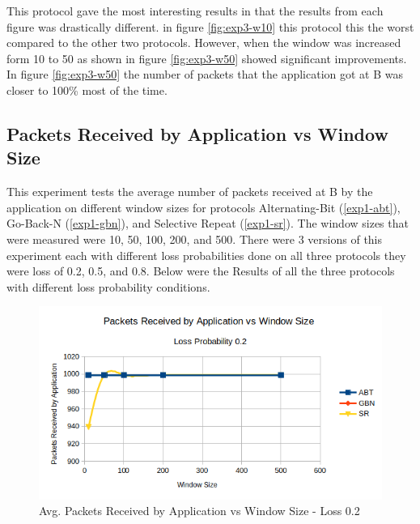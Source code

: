 \documentclass[10pt, a4paper]{article}
\begin{document}
    	This protocol gave the most interesting results in that the results from each figure was drastically different. in figure \ref{fig:exp3-w10} this protocol this the worst compared to the other two protocols. However, when the window was increased form 10 to 50 as shown in figure \ref{fig:exp3-w50} showed significant improvements. In figure \ref{fig:exp3-w50} the number of packets that the application got at B was closer to 100\% most of the time.   
    
  \subsection{Packets Received by Application vs Window Size \label{exp4}}
  
     This experiment tests the average number of packets received at B by the application on different window sizes for protocols Alternating-Bit (\ref{exp1-abt}), Go-Back-N (\ref{exp1-gbn}), and Selective Repeat (\ref{exp1-sr}). The window sizes that were measured were 10, 50, 100, 200, and 500. There were 3 versions of this experiment each with different loss probabilities done on all three protocols they were loss of 0.2, 0.5, and 0.8. Below were the Results of all the three protocols with different loss probability conditions. 
     
    \begin{figure}[H]
        \includegraphics[width=\textwidth]{exp4-l02.png}
        \centering
        \caption{Avg. Packets Received by Application vs Window Size - Loss 0.2 }
        \label{fig:exp4-l0.2}
    \end{figure}
      
\end{document}

